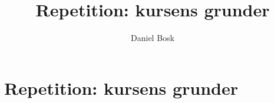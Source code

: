 \documentclass[a4paper,10pt,oneside,openright,
               oldfontcommands]{memoir}
\begin{document}
\title{%
  Repetition: kursens grunder
}
\author{Daniel Bosk}

\maketitle

\begin{abstract}
  
\end{abstract}

\clearpage

\tableofcontents*

\chapter{Repetition: kursens grunder}



\appendix


\printbibliography
\end{document}
